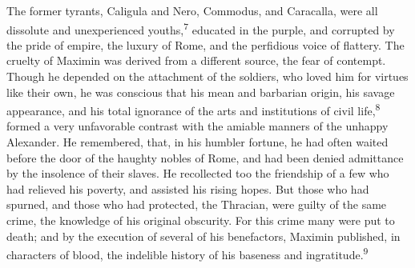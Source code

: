 The former tyrants, Caligula and Nero, Commodus, and Caracalla,
were all dissolute and unexperienced youths,\textsuperscript{7} educated in the
purple, and corrupted by the pride of empire, the luxury of Rome,
and the perfidious voice of flattery. The cruelty of Maximin was
derived from a different source, the fear of contempt. Though he
depended on the attachment of the soldiers, who loved him for
virtues like their own, he was conscious that his mean and
barbarian origin, his savage appearance, and his total ignorance
of the arts and institutions of civil life,\textsuperscript{8} formed a very
unfavorable contrast with the amiable manners of the unhappy
Alexander. He remembered, that, in his humbler fortune, he had
often waited before the door of the haughty nobles of Rome, and
had been denied admittance by the insolence of their slaves. He
recollected too the friendship of a few who had relieved his
poverty, and assisted his rising hopes. But those who had
spurned, and those who had protected, the Thracian, were guilty
of the same crime, the knowledge of his original obscurity. For
this crime many were put to death; and by the execution of
several of his benefactors, Maximin published, in characters of
blood, the indelible history of his baseness and ingratitude.\textsuperscript{9}




